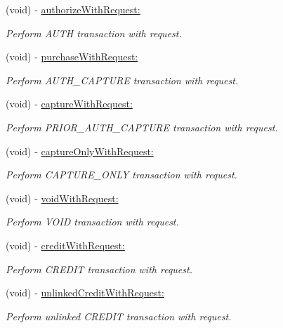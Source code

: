 \begin{DoxyCompactItemize}
(void) -\/ \hyperlink{interface_auth_net_ae8435d36d1a6d00e6e771a9fa58ec210}{authorizeWithRequest:}
\begin{DoxyCompactList}\small\item\em Perform AUTH transaction with request. \item\end{DoxyCompactList}\item 
(void) -\/ \hyperlink{interface_auth_net_a466bfa76518d3dd27fc7eb38a7967812}{purchaseWithRequest:}
\begin{DoxyCompactList}\small\item\em Perform AUTH\_\-CAPTURE transaction with request. \item\end{DoxyCompactList}\item 
(void) -\/ \hyperlink{interface_auth_net_a6a586e0765c774199ccecbebdf072d3d}{captureWithRequest:}
\begin{DoxyCompactList}\small\item\em Perform PRIOR\_\-AUTH\_\-CAPTURE transaction with request. \item\end{DoxyCompactList}\item 
(void) -\/ \hyperlink{interface_auth_net_a5d2e5d9f91f57cf1ea72a8f091aebf2d}{captureOnlyWithRequest:}
\begin{DoxyCompactList}\small\item\em Perform CAPTURE\_\-ONLY transaction with request. \item\end{DoxyCompactList}\item 
(void) -\/ \hyperlink{interface_auth_net_aef8d13917d406c5056a2176817562260}{voidWithRequest:}
\begin{DoxyCompactList}\small\item\em Perform VOID transaction with request. \item\end{DoxyCompactList}\item 
(void) -\/ \hyperlink{interface_auth_net_a95bc4a5faa7ce40df5295837b98617b3}{creditWithRequest:}
\begin{DoxyCompactList}\small\item\em Perform CREDIT transaction with request. \item\end{DoxyCompactList}\item 
(void) -\/ \hyperlink{interface_auth_net_a5b2bc486ff67a6f7fd8c8708c89057a0}{unlinkedCreditWithRequest:}
\begin{DoxyCompactList}\small\item\em Perform unlinked CREDIT transaction with request. \item\end{DoxyCompactList}\item 

\end{DoxyCompactItemize}
